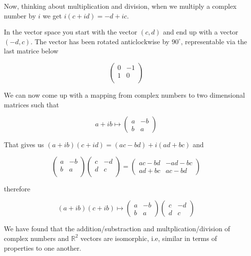 \documentclass[12pt]{article}
\newcommand{\R}{{\mathbb{R}}}
\begin{document}
    Now, thinking about multiplication and division, when we multiply a complex number by $i$ we
    get $i(c + id) = -d + ic$. 
    
    In the vector space you start with the vector $(c, d)$ and end up with a 
    vector $(-d, c)$. The vector has been rotated anticlockwise by $90^{\circ}$, representable via 
    the last matrice below
    
    \[
        \begin{pmatrix}
            0 & -1 \\
            1 & 0 \\
        \end{pmatrix}    
    \]

    We can now come up with a mapping from complex numbers to two dimensional matrices such that

    \[
        a + ib \mapsto \begin{pmatrix}
            a & -b \\
            b & a
        \end{pmatrix}
    \]

    That gives us $(a + ib)(c + id) = (ac - bd) + i(ad + bc)$ and

    \[
        \begin{pmatrix}
            a & -b\\
            b & a \\
        \end{pmatrix}
        \begin{pmatrix}
            c & -d \\
            d & c \\
        \end{pmatrix} = 
        \begin{pmatrix}
            ac-bd & -ad-bc\\
            ad + bc & ac -bd 
        \end{pmatrix}
    \]

    therefore

    \[
        (a + ib)(c + ib) \mapsto \begin{pmatrix}
            a & -b \\
            b & a
        \end{pmatrix}  
        \begin{pmatrix}
            c & -d \\
            d & c
        \end{pmatrix}
    \]

    We have found that the addition/substraction and multplication/division of 
    complex numbers and $\R^2$ vectors are isomorphic, i.e, similar in terms of 
    properties to one another. 
\end{document}

